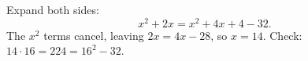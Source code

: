 Expand both sides:
\[
x^2+2x=x^2+4x+4-32 .
\]
The $x^2$ terms cancel, leaving $2x=4x-28$, so $x=\boxed{14}$. Check: $14\cdot16=224=16^2-32$.
